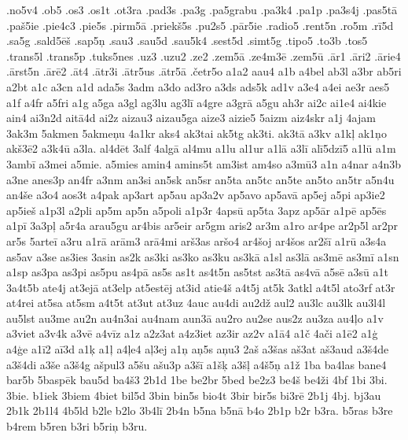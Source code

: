 {{.no5v4 .ob5 .os3 .os1t .ot3ra .pad3s .pa3g .pa5grabu .pa3k4 .pa1p
.pa3s4j .pas5t\={a} .pa\v{s}5ie .pie4c3 .pie5s .pirm5\={a} .priek\v{s}5s
.pu2s5 .p\={a}r5ie .radio5 .rent5n .ro5m .r\={i}5d .sa5g
.sald5\={e}\v{s} .sap5\c{n} .sau3 .sau5d .sau5k4 .sest5d .simt5g
.tipo5 .to3b .tos5 .trans5l .trans5p .tuks5nes .uz3 .uzu2 .ze2
.zem5\={a} .ze4m3\={e} .zem5\={u} .\={a}r1 .\={a}ri2 .\={a}rie4
.\={a}rst5n .\={a}r\={e}2 .\={a}t4 .\={a}tr3i .\={a}tr5us
.\={a}tr5\={a} .\v{c}etr5o a1a2 aau4 a1b a4bel ab3l a3br
ab5ri a2bt a1c a3cn a1d ada5s 3adm a3do ad3ro a3ds ads5k ad1v a3e4 a4ei
ae3r aes5 a1f a4fr a5fri a1g a5ga a3gl ag3lu ag3l\={i} a4gre a3gr\={a}
a5gu ah3r ai2c ai1e4 ai4kie ain4 ai3n2d ait\={a}4d ai2z aizau3
aizau5ga aize3 aizie5 5aizm aiz4skr a1j 4ajam 3ak3m 5akmen 5akme\c{n}u
4a1kr aks4 ak3tai ak5tg ak3ti. ak3t\={a} a3kv a1k\c{l} ak1\c{n}o
ak\v{s}3\={e}2 a3k4\={u} a3la. al4d\={e}t 3alf 4alg\={a}
al4mu a1lu al1ur a1l\={a} a3l\={i} al\={i}5dz\={i}5 a1l\={u}
a1m 3amb\={i} a3mei a5mie. a5mies amin4 amins5t am3ist am4so
a3m\={u}3 a1n a4nar a4n3b a3ne anes3p an4fr a3nm an3si an5sk an5sr
an5ta an5tc an5te an5to an5tr a5n4u an4\v{s}e a3o4 aos3t a4pak ap3art
ap5au ap3a2v ap5avo ap5av\={a} ap5ej a5pi ap3ie2 ap5ie\v{s} a1p3l
a2pli ap5m ap5n a5poli a1p3r 4aps\={u} ap5ta 3apz ap5\={a}r a1p\={e}
ap5\={e}s a1p\={i} 3a3p\c{l} a5r4a arau5gu ar4bis ar5eir ar5gm
aris2 ar3m a1ro ar4pe ar2p5l ar2pr ar5s 5arte\={i} a3ru a1r\={a}
ar\={a}m3 ar\={a}4mi ar\v{s}3as ar\v{s}o4 ar4\v{s}oj ar4\v{s}os
ar2\v{s}\={i} a1r\={u} a3s4a as5av a3se as3ies 3asin as2k
as3ki as3ko as3ku as3k\={a} a1sl as3l\={a} as3m\={e} as3m\={i} a1sn
a1sp as3pa as3pi as5pu as4p\={a} as5s as1t as4t5n as5tst as3t\={a}
as4v\={a} a5s\={e} a3s\={u} a1t 3a4t5b ate4j at3ej\={a} at3elp
at5est\={e}j at3id atie4\v{s} a4t5j at5k 3atkl a4t5l ato3rf at3r
at4rei at5sa at5sm a4t5t at3ut at3uz 4auc au4di au2d\v{z} aul2 au3lc
au3lk au3l4l au5lst au3me au2n au4n3ai au4nam aun3\={a} au2ro au2se
aus2z au3za au4\c{l}o a1v a3viet a3v4k a3v\={e} a4v\={i}z a1z a2z3at
a4z3iet az3ir az2v a1\={a}4 a1\v{c} 4a\v{c}i a1\={e}2 a1\c{g}
a4\c{g}e a1\={i}2 a\={i}3d a1\c{k} a1\c{l} a4\c{l}e4 a\c{l}3ej
a1\c{n} a\c{n}5s a\c{n}u3 2a\v{s} a3\v{s}as a\v{s}3at a\v{s}3aud
a3\v{s}4de a3\v{s}4di a3\v{s}e a3\v{s}4g a\v{s}pul3 a5\v{s}u
a\v{s}u3p a3\v{s}\={i} a1\v{s}\c{k} a3\v{s}\c{l} a4\v{s}5\c{n}
a1\v{z} 1ba ba4las bane4 bar5b 5basp\={e}k bau5d ba4\v{s}3
2b1d 1be be2br 5bed be2z3 be4\v{s} be4\v{z}i 4bf 1bi 3bi. 3bie.
b1iek 3biem 4biet bil5d 3bin bin5s bio4t 3bir bir5s bi3r\={e} 2b1j
4bj. bj3au 2b1k 2b1l4 4b5ld b2le b2lo 3b4l\={i} 2b4n b5na b5n\={a}
b4o 2b1p b2r b3ra. b5ras b3re b4rem b5ren b3ri b5ri\c{n} b3ru.
}}
